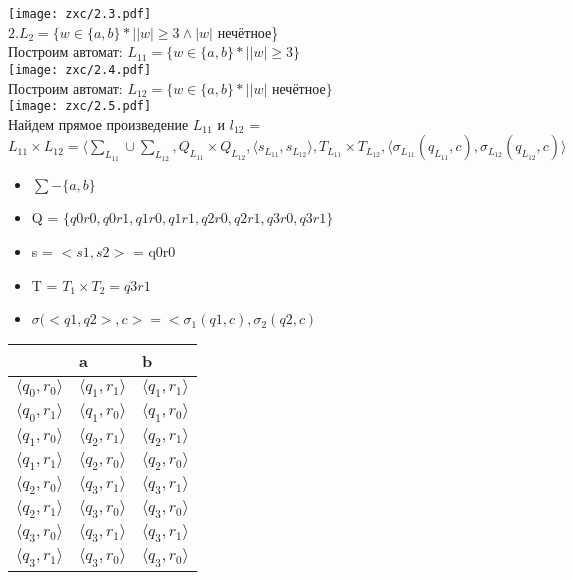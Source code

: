 \documentclass{article}
\begin{document}
  \texttt{[image: zxc/2.3.pdf]}\\
  $2. L_2 = \{w \in \{a,b\} * ||w| \geq 3 \wedge |w|$ нечётное\}\\
  Построим автомат: $L_{11} = \{w \in \{a,b\} * ||w| \geq 3 \}$\\
    \texttt{[image: zxc/2.4.pdf]}\\
  Построим автомат: $L_{12} = \{w \in \{a,b\} * ||w|$ нечётное$\}$ \\
     \texttt{[image: zxc/2.5.pdf]}\\
    Найдем прямое произведение $L_{11}$ и $l_{12}$ = 
  $L_{11}\times L_{12}=\langle \sum_L_{11}\cup\sum_L_{12}, Q_L_{11}\times Q_L_{12}, \langle s_L_{11},s_L_{12}\rangle, T_L_{11}\times T_L_{12}, \langle\sigma_L_{11}(q_L_{11},c),\sigma_L_{12}(q_L_{12},c) \rangle$
  \begin{itemize}
      \item $\sum - \{a,b\}$\\
      \item Q = $\{q0r0,q0r1,q1r0,q1r1,q2r0,q2r1,q3r0,q3r1\}$\\
      \item s = $<s1,s2>$ = q0r0\\
      \item T = $T_1 \times T_2 = q3r1 $\\
      \item $\sigma(<q1,q2>,c> =  < \sigma_1(q1,c),\sigma_2(q2,c)$\\
  \end{itemize}
			\begin{tabular}{ | l | l | l | }
				\hline
				& a & b \\ \hline
				$\langle q_0,r_0\rangle$ & $\langle q_1,r_1\rangle$ & $\langle q_1,r_1\rangle$ \\
				$\langle q_0,r_1\rangle$ & $\langle q_1,r_0\rangle$ & $\langle q_1,r_0\rangle$ \\
				$\langle q_1,r_0\rangle$ & $\langle q_2,r_1\rangle$ & $\langle q_2,r_1\rangle$ \\
				$\langle q_1,r_1\rangle$ & $\langle q_2,r_0\rangle$ & $\langle q_2,r_0\rangle$ \\
				$\langle q_2,r_0\rangle$ & $\langle q_3,r_1\rangle$ & $\langle q_3,r_1\rangle$ \\
				$\langle q_2,r_1\rangle$ & $\langle q_3,r_0\rangle$ & $\langle q_3,r_0\rangle$ \\
				$\langle q_3,r_0\rangle$ & $\langle q_3,r_1\rangle$ & $\langle q_3,r_1\rangle$ \\
				$\langle q_3,r_1\rangle$ & $\langle q_3,r_0\rangle$ & $\langle q_3,r_0\rangle$ \\
				\hline
			\end{tabular}\\
\end{document}
